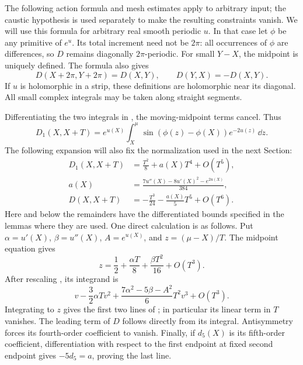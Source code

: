The following action formula and mesh estimates apply to arbitrary
input; the caustic hypothesis is used separately to make the resulting
constraints vanish. We will use this formula for arbitrary real smooth
periodic \(u\).
In that case let \(\phi\) be any primitive of \(e^u\).  Its total
increment need not be \(2\pi\): all occurrences of \(\phi\) are
differences, so \(D\) remains diagonally \(2\pi\)-periodic.  For small
\(Y-X\), the midpoint is uniquely defined.  The formula also gives
\begin{equation}\label{ana:action-symmetries}
D(X+2\pi,Y+2\pi)=D(X,Y),\qquad D(Y,X)=-D(X,Y).
\end{equation}
If \(u\) is holomorphic in a strip, these definitions are holomorphic
near its diagonal.  All small complex integrals may be taken along
straight segments.

Differentiating the two integrals in , the
moving-midpoint terms cancel.  Thus
\begin{equation}\label{ana:D1-integral}
D_1(X,X+T)=
e^{u(X)}\int_X^\mu
\sin(\phi(z)-\phi(X))e^{-2u(z)}\,\dd z.
\end{equation}
The following expansion will also fix the normalization used in the
next Section:
\begin{equation}\label{ana:action-expansion}
\begin{split}
D_1(X,X+T)&=\frac{T^2}{8}+a(X)T^4+O(T^5),\\
a(X)&=\frac{7u''(X)-8u'(X)^2-e^{2u(X)}}{384},\\
D(X,X+T)&=-\frac{T^3}{24}-\frac{a(X)}5T^5+O(T^6).
\end{split}
\end{equation}
Here and below the remainders have the differentiated bounds specified
in the lemmas where they are used.  One direct calculation is as
follows.  Put \(\alpha=u'(X)\), \(\beta=u''(X)\), \(A=e^{u(X)}\), and
\(z=(\mu-X)/T\).  The midpoint equation gives
\[
z=\frac12+\frac{\alpha T}{8}+\frac{\beta T^2}{16}+O(T^3).
\]
After rescaling , its integrand is
\[
v-\frac32\alpha T v^2
+\frac{7\alpha^2-5\beta-A^2}{6}T^2v^3+O(T^3).
\]
Integrating to \(z\) gives the first two lines of
; in particular its linear term in \(T\)
vanishes.  The leading term of \(D\) follows directly from its integral.
Antisymmetry forces its fourth-order coefficient to vanish.
Finally, if \(d_5(X)\) is its fifth-order coefficient, differentiation
with respect to the first endpoint at fixed second endpoint gives
\(-5d_5=a\), proving the last line.

